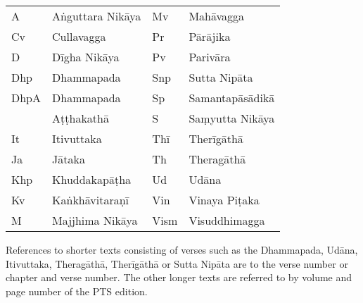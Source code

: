 \clearpage
\thispagestyle{empty}

{}
\bigskip

{\raggedright
\ifhandbookedition
\fontsize{9}{13}\selectfont
\else
\fontsize{10}{14}\selectfont
\fi

\begin{tabular}{@{}llll@{}}
  A    & Aṅguttara Nikāya & Mv   & Mahāvagga       \\
  Cv   & Cullavagga       & Pr   & Pārājika        \\
  D    & Dīgha Nikāya     & Pv   & Parivāra        \\
  Dhp  & Dhammapada       & Snp  & Sutta Nipāta    \\
  DhpA & Dhammapada       & Sp   & Samantapāsādikā \\
       & Aṭṭhakathā       & S    & Saṃyutta Nikāya \\
  It   & Itivuttaka       & Thī  & Therīgāthā      \\
  Ja   & Jātaka           & Th   & Theragāthā      \\
  Khp  & Khuddakapāṭha    & Ud   & Udāna           \\
  Kv   & Kaṅkhāvitaraṇī   & Vin  & Vinaya Piṭaka   \\
  M    & Majjhima Nikāya  & Vism & Visuddhimagga   \\
\end{tabular}

\bigskip

References to shorter texts consisting of verses such as the Dhammapada, Udāna,
Itivuttaka, Theragāthā, Therīgāthā or Sutta Nipāta are to the verse number or
chapter and verse number. The other longer texts are referred to by volume and
page number of the PTS edition.

}

